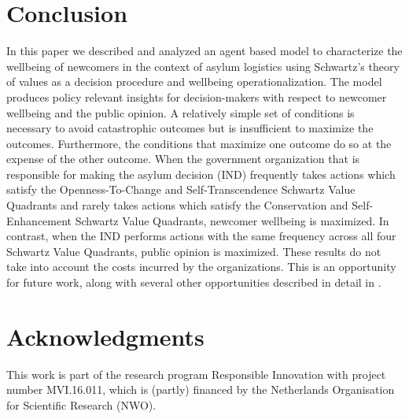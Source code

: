 \documentclass{scspaperproc}
\theoremstyle{scsthe}
\begin{document}

\section{Conclusion}
\label{sec:discussion}
In this paper we described and analyzed an agent based model to characterize the wellbeing of newcomers in the context of asylum logistics using Schwartz's theory of values as a decision procedure and wellbeing operationalization. The model produces policy relevant insights for decision-makers with respect to newcomer wellbeing and the public opinion. A relatively simple set of conditions is necessary to avoid catastrophic outcomes but is insufficient to maximize the outcomes. Furthermore, the conditions that maximize one outcome do so at the expense of the other outcome. When the government organization that is responsible for making the asylum decision (IND) frequently takes actions which satisfy the Openness-To-Change and Self-Transcendence Schwartz Value Quadrants and rarely takes actions which satisfy the Conservation and Self-Enhancement Schwartz Value Quadrants, newcomer wellbeing is maximized. In contrast, when the IND performs actions with the same frequency across all four Schwartz Value Quadrants, public opinion is maximized. These results do not take into account the costs incurred by the organizations. This is an opportunity for future work, along with several other opportunities described in detail in \cite{phil.masters.thesis}. 
\section*{Acknowledgments}
This work is part of the research program Responsible Innovation with project number MVI.16.011, which is (partly) financed by the Netherlands Organisation for Scientific Research (NWO). %


\end{document}
